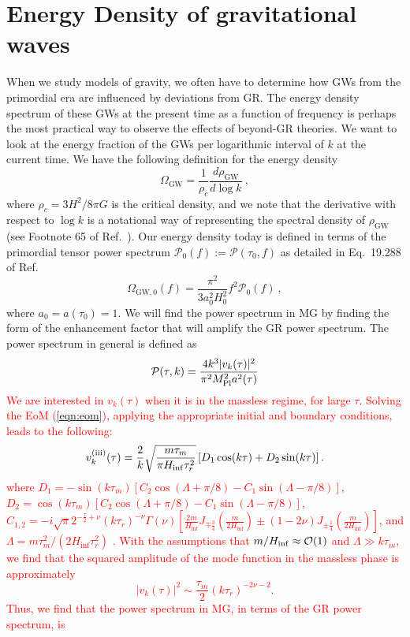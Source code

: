 \documentclass[prd,twocolumn,aps,psfig,nofootinbib,nobibnotes,superscriptaddress,preprintnumbers,times]{revtex4-2}
\def\red{\textcolor{red}}
\begin{document}
\section{Energy Density of gravitational waves}\label{sec:energy}
When we study models of gravity, we often have to determine how GWs from the primordial era are influenced by deviations from GR. The energy density spectrum of these GWs at the present time as a function of frequency is perhaps the most practical way to observe the effects of beyond-GR theories. We want to look at the energy fraction of the GWs per logarithmic interval of $k$ at the current time. We have the following definition for the energy density 
\begin{equation}\label{eqn:omega_sfm}
    \Omega_\text{GW} = \frac{1}{\rho_c}\frac{d \rho_\text{GW}} {d \log{k}} \ ,
\end{equation}
where $\rho_c = 3H^2/8\pi G$ is the critical density, and we note that the derivative with respect to $\log k$ is a notational way of representing the spectral density of $\rho_\text{GW}$ (see Footnote 65 of Ref.\ \cite{Maggiore:v1}). Our energy density today is defined in terms of the primordial tensor power spectrum $\mathcal{P}_0(f) := \mathcal{P}(\tau_0, f)$ as detailed in Eq.\ 19.288 of Ref.\ \cite{Maggiore:v2}
\begin{equation}\label{eqn:omega_0_sfm}
    \Omega_{\text{GW},0}(f) = \frac{\pi^2}{3a_0^2H_0^2}f^2 \mathcal{P}_0(f) \ , 
\end{equation}
where $a_0 = a(\tau_0) = 1$. We will find the power spectrum in MG by finding the form of the enhancement factor that will amplify the GR power spectrum. The power spectrum in general is defined as 
\begin{equation} \label{eqn:power_spec}
    \mathcal{P}(\tau,k) = \frac{4k^3 |v_k(\tau)|^2}{\pi^2 M_{\rm Pl}^2 a^2(\tau)}
\end{equation}
\red{We are interested in $v_k(\tau)$ when it is in the massless regime, for large $\tau$. Solving the EoM (\ref{eqn:eom}), applying the appropriate initial and boundary conditions, leads to the following: \begin{equation} \label{eqn:mode_phase_3}
        v_k^{\rm (iii)}(\tau) = \frac{2}{k}\sqrt{\frac{m\tau_m}{\pi H_{\inf} \tau_r^2}}\left[D_1 \cos(k\tau) + D_2 \sin(k\tau) \right].
    \end{equation}
where $D_1 = -\sin(k\tau_m)[C_2\cos(\Lambda + \pi/8) - C_1 \sin(\Lambda -\pi/8)]$, $D_2 = \cos(k\tau_m)[C_2\cos(\Lambda + \pi/8) - C_1 \sin(\Lambda -\pi/8)]$, $C_{1,2} = -i\sqrt{\pi} 2^{-\frac{\tau}{2}+\nu}(k\tau_r)^{-\nu}\Gamma(\nu)[\frac{2m}{H_{\inf}}J_{\mp \frac{3}{4}}(\frac{m}{2H_{\inf}})\pm (1-2\nu)J_{\pm \frac{1}{4}}(\frac{m}{2H_{\inf}}) ] $, and $\Lambda = m\tau_m^2/(2H_{\inf}\tau_r^2)$ \cite{Fujita:2018ehq}. With the assumptions that $m/H_{\rm inf} \approx \mathcal{O}(1)$ and $\Lambda \gg k\tau_m$, we find that the squared amplitude of the mode function in the massless phase is approximately 
\begin{equation}\label{eqn:mode_squared}
    |v_k(\tau)|^2 \sim \frac{\tau_m}{2}(k \tau_r)^{-2\nu - 2}.
\end{equation}
Thus, we find that the power spectrum in MG, in terms of the GR power spectrum, is }
\end{document}

